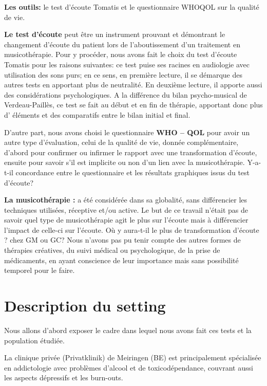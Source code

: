 \textbf{Les outils:} le test d'écoute Tomatis et le questionnaire WHOQOL sur la qualité de vie.


\textbf { Le test d'écoute}  peut être un instrument prouvant et démontrant le changement d'écoute du 
patient
lors de l'aboutissement d'un traitement en musicothérapie.
 Pour y procéder, nous  avons fait le choix du test d'écoute Tomatis pour les raisons suivantes:  ce test 
 puise ses racines  en 
  audiologie avec utilisation des sons purs; en ce sens, en première lecture, il se démarque des autres 
  tests en apportant plus de neutralité. En deuxième lecture, il apporte aussi des 
  considérations psychologiques. A la différence  du bilan psycho-musical de Verdeau-Paillès, ce test se 
  fait au début et en fin de thérapie, apportant donc plus 
  d' éléments et des comparatifs 
  entre le bilan initial et final.
  
  D'autre part, nous avons choisi le questionnaire \textbf {WHO -- QOL} pour avoir un autre type 
  d'évaluation, celui 
  de la qualité de vie, donnée complémentaire, d'abord  pour confirmer ou infirmer le rapport avec une  
  transformation d'écoute, ensuite pour savoir s'il est implicite  ou non d'un lien avec la musicothérapie.
 Y-a-t-il concordance entre  le questionnaire  et les résultats graphiques issus du test d'écoute?

 \textbf{La musicothérapie :}  a été considérée dans sa globalité, sans 
 différencier les 
 techniques utilisées, réceptive et/ou active. Le but de ce travail n'était pas de savoir quel  type de 
 musicothérapie 
 agit le plus sur l'écoute mais à différencier l'impact de celle-ci sur l'écoute. 
 Où y aura-t-il le plus de transformation d'écoute ? chez GM ou GC?
 Nous n'avons pas pu tenir compte des autres for\-mes de thérapies créatives, du suivi médical ou 
 psychologique, de 
 la prise de médicaments, en ayant conscience de leur importance mais sans possibilité temporel pour  le 
 faire. 
 
 
 
 \section{Description du setting}
 Nous allons
 d'abord exposer le cadre dans lequel nous avons fait ces tests et la
 population étudiée.
 
 La clinique privée (Privatklinik)
 de Meiringen (BE) est  principalement spécialisée en
 addictologie avec problèmes d'alcool et de toxicodépendance, couvrant aussi les aspects dépressifs
 et les
 burn-outs.
 
